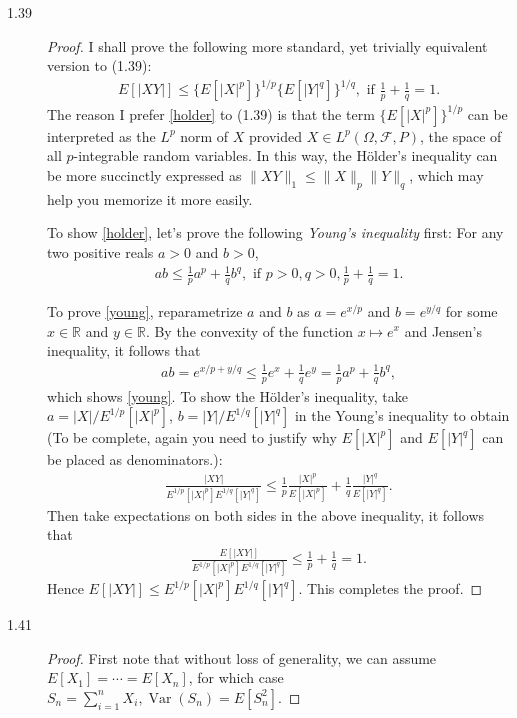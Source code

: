 \documentclass{article}
\newcommand{\real}{\mathbb{R}}
\DeclareMathOperator*{\Var}{Var}
\newcommand{\sigmafield}{\mathscr{F}}
\theoremstyle{definition}
\theoremstyle{plain}
\theoremstyle{remark}
\begin{document}
\begin{description}
\item[1.39]
\begin{proof}
I shall prove the following more standard, yet trivially equivalent version to (1.39):
\begin{align}\label{holder}
E[|XY|] \leq \{E[|X|^p]\}^{1/p}\{E[|Y|^q]\}^{1/q}, \text{ if } \frac{1}{p} + \frac{1}{q} = 1.
\end{align}
The reason I prefer \eqref{holder} to (1.39) is that the term $\{E[|X|^p]\}^{1/p}$ can be 
interpreted as the $L^p$ norm of $X$ provided $X \in L^p(\Omega, \sigmafield, P)$, the space of
all $p$-integrable random variables. In this way, the H\"{o}lder's inequality can be more 
succinctly expressed as $\|XY\|_1 \leq \|X\|_p\|Y\|_q$, which may help you memorize it more 
easily.

To show \eqref{holder}, let's prove the following \emph{Young's inequality} first: For any
two positive reals $a > 0$ and $b > 0$,
\begin{align}\label{young}
ab \leq \frac{1}{p}a^p + \frac{1}{q}b^q, \text{ if } p > 0, q > 0, \frac{1}{p} + \frac{1}{q} 
= 1.
\end{align}

To prove \eqref{young}, reparametrize $a$ and $b$ as $a = e^{x/p}$ and $b = e^{y/q}$ for some
$x \in \real$ and $y \in \real$. By the convexity of the function $x \mapsto e^x$ and 
Jensen's inequality, it follows that
\begin{align*}
    ab = e^{x/p + y/q} \leq \frac{1}{p}e^x + \frac{1}{q}e^y = \frac{1}{p}a^p + 
    \frac{1}{q}b^q,
\end{align*}
which shows \eqref{young}. To show the H\"{o}lder's inequality, take $a = 
|X|/E^{1/p}[|X|^p]$, $b = |Y|/E^{1/q}[|Y|^q]$ in the Young's inequality to obtain 
(To be complete, again you need to justify why $E[|X|^p]$ and $E[|Y|^q]$ can be placed 
as denominators.):
\begin{align*}
    \frac{|XY|}{E^{1/p}[|X|^p]E^{1/q}[|Y|^q]} 
    \leq \frac{1}{p} \frac{|X|^p}{E[|X|^p]} + \frac{1}{q}\frac{|Y|^q}{E[|Y|^q]}.
\end{align*}
Then take expectations on both sides in the above inequality, it follows that 
\begin{align*}
    \frac{E[|XY|]}{E^{1/p}[|X|^p]E^{1/q}[|Y|^q]} 
    \leq \frac{1}{p} + \frac{1}{q} = 1.
\end{align*}
Hence $E[|XY|] \leq E^{1/p}[|X|^p]E^{1/q}[|Y|^q]$. This completes the proof.
\end{proof}

\item[1.41]
\begin{proof}
First note that without loss of generality, we can assume $E[X_1] = \cdots
= E[X_n]$, for which case $S_n = \sum_{i = 1}^n X_i, \Var(S_n) = E[S_n^2]$. 


\end{proof}
\end{description}
\end{document}
